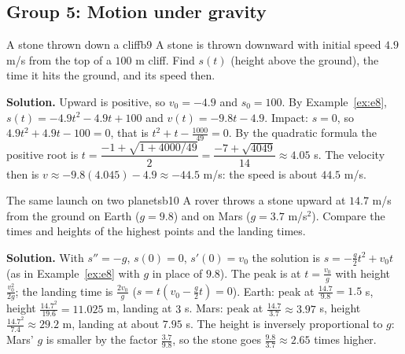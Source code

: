 \documentclass[11pt]{article}
\begin{document}
\subsection*{Group 5: Motion under gravity}

\begin{exmp}{A stone thrown down a cliff}{b9}
A stone is thrown downward with initial speed $4.9$ m/s from the top of a $100$ m cliff. Find $s(t)$ (height above the ground), the time it hits the ground, and its speed then.

\textbf{Solution.} Upward is positive, so $v_0=-4.9$ and $s_0=100$. By Example~\ref{ex:e8}, $s(t)=-4.9t^2-4.9t+100$ and $v(t)=-9.8t-4.9$. Impact: $s=0$, so $4.9t^2+4.9t-100=0$, that is $t^2+t-\frac{1000}{49}=0$. By the quadratic formula the positive root is $t=\dfrac{-1+\sqrt{1+4000/49}}2=\dfrac{-7+\sqrt{4049}}{14}\approx4.05$ s. The velocity then is $v\approx-9.8(4.045)-4.9\approx-44.5$ m/s: the speed is about $44.5$ m/s.
\end{exmp}

\begin{exmp}{The same launch on two planets}{b10}
A rover throws a stone upward at $14.7$ m/s from the ground on Earth ($g=9.8$) and on Mars ($g=3.7$ m/s$^2$). Compare the times and heights of the highest points and the landing times.

\textbf{Solution.} With $s''=-g$, $s(0)=0$, $s'(0)=v_0$ the solution is $s=-\frac g2t^2+v_0t$ (as in Example~\ref{ex:e8} with $g$ in place of $9.8$). The peak is at $t=\frac{v_0}g$ with height $\frac{v_0^2}{2g}$; the landing time is $\frac{2v_0}g$ ($s=t\left(v_0-\frac g2t\right)=0$). Earth: peak at $\frac{14.7}{9.8}=1.5$ s, height $\frac{14.7^2}{19.6}=11.025$ m, landing at $3$ s. Mars: peak at $\frac{14.7}{3.7}\approx3.97$ s, height $\frac{14.7^2}{7.4}\approx29.2$ m, landing at about $7.95$ s. The height is inversely proportional to $g$: Mars' $g$ is smaller by the factor $\frac{3.7}{9.8}$, so the stone goes $\frac{9.8}{3.7}\approx2.65$ times higher.
\end{exmp}
\end{document}
